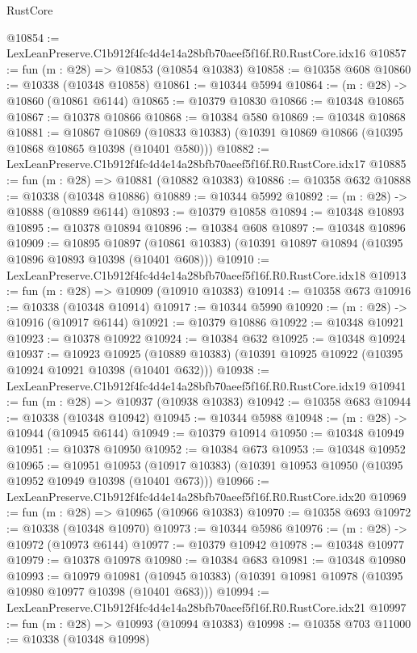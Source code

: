 \begin{lexlean}{RustCore}
\begin{coremodule}
@10854 := LexLeanPreserve.C1b912f4fc4d4e14a28bfb70aeef5f16f.R0.RustCore.idx16
@10857 := fun (m : @28) => @10853 (@10854 @10383)
@10858 := @10358 @608
@10860 := @10338 (@10348 @10858)
@10861 := @10344 @5994
@10864 := (m : @28) -> @10860 (@10861 @6144)
@10865 := @10379 @10830
@10866 := @10348 @10865
@10867 := @10378 @10866
@10868 := @10384 @580
@10869 := @10348 @10868
@10881 := @10867
    @10869
    (@10833 @10383)
    (@10391 @10869 @10866 (@10395 @10868 @10865 @10398 (@10401 @580)))
@10882 := LexLeanPreserve.C1b912f4fc4d4e14a28bfb70aeef5f16f.R0.RustCore.idx17
@10885 := fun (m : @28) => @10881 (@10882 @10383)
@10886 := @10358 @632
@10888 := @10338 (@10348 @10886)
@10889 := @10344 @5992
@10892 := (m : @28) -> @10888 (@10889 @6144)
@10893 := @10379 @10858
@10894 := @10348 @10893
@10895 := @10378 @10894
@10896 := @10384 @608
@10897 := @10348 @10896
@10909 := @10895
    @10897
    (@10861 @10383)
    (@10391 @10897 @10894 (@10395 @10896 @10893 @10398 (@10401 @608)))
@10910 := LexLeanPreserve.C1b912f4fc4d4e14a28bfb70aeef5f16f.R0.RustCore.idx18
@10913 := fun (m : @28) => @10909 (@10910 @10383)
@10914 := @10358 @673
@10916 := @10338 (@10348 @10914)
@10917 := @10344 @5990
@10920 := (m : @28) -> @10916 (@10917 @6144)
@10921 := @10379 @10886
@10922 := @10348 @10921
@10923 := @10378 @10922
@10924 := @10384 @632
@10925 := @10348 @10924
@10937 := @10923
    @10925
    (@10889 @10383)
    (@10391 @10925 @10922 (@10395 @10924 @10921 @10398 (@10401 @632)))
@10938 := LexLeanPreserve.C1b912f4fc4d4e14a28bfb70aeef5f16f.R0.RustCore.idx19
@10941 := fun (m : @28) => @10937 (@10938 @10383)
@10942 := @10358 @683
@10944 := @10338 (@10348 @10942)
@10945 := @10344 @5988
@10948 := (m : @28) -> @10944 (@10945 @6144)
@10949 := @10379 @10914
@10950 := @10348 @10949
@10951 := @10378 @10950
@10952 := @10384 @673
@10953 := @10348 @10952
@10965 := @10951
    @10953
    (@10917 @10383)
    (@10391 @10953 @10950 (@10395 @10952 @10949 @10398 (@10401 @673)))
@10966 := LexLeanPreserve.C1b912f4fc4d4e14a28bfb70aeef5f16f.R0.RustCore.idx20
@10969 := fun (m : @28) => @10965 (@10966 @10383)
@10970 := @10358 @693
@10972 := @10338 (@10348 @10970)
@10973 := @10344 @5986
@10976 := (m : @28) -> @10972 (@10973 @6144)
@10977 := @10379 @10942
@10978 := @10348 @10977
@10979 := @10378 @10978
@10980 := @10384 @683
@10981 := @10348 @10980
@10993 := @10979
    @10981
    (@10945 @10383)
    (@10391 @10981 @10978 (@10395 @10980 @10977 @10398 (@10401 @683)))
@10994 := LexLeanPreserve.C1b912f4fc4d4e14a28bfb70aeef5f16f.R0.RustCore.idx21
@10997 := fun (m : @28) => @10993 (@10994 @10383)
@10998 := @10358 @703
@11000 := @10338 (@10348 @10998)

\end{coremodule}
\end{lexlean}
